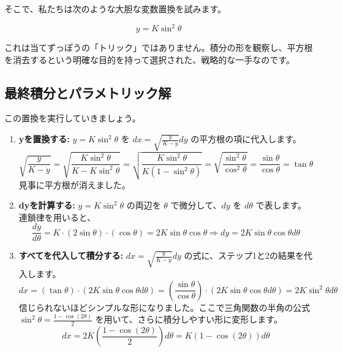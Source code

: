 \documentclass[12pt,a4paper]{ltjsarticle}
\begin{document}
そこで、私たちは次のような大胆な変数置換を試みます。

\begin{equation}
y = K\sin^2\theta
\end{equation}

これは当てずっぽうの「トリック」ではありません。積分の形を観察し、平方根を消去するという明確な目的を持って選択された、戦略的な一手なのです。

\subsection{最終積分とパラメトリック解}

この置換を実行していきましょう。

\begin{enumerate}
\item \textbf{yを置換する:} $y = K \sin^2\theta$ を $dx = \sqrt{\frac{y}{K-y}} dy$ の平方根の項に代入します。
\begin{equation}
\sqrt{\frac{y}{K-y}} = \sqrt{\frac{K \sin^2\theta}{K - K \sin^2\theta}} = \sqrt{\frac{K \sin^2\theta}{K(1 - \sin^2\theta)}} = \sqrt{\frac{\sin^2\theta}{\cos^2\theta}} = \frac{\sin\theta}{\cos\theta} = \tan\theta
\end{equation}
見事に平方根が消えました。

\item \textbf{dyを計算する:} $y = K \sin^2\theta$ の両辺を $\theta$ で微分して、$dy$ を $d\theta$ で表します。連鎖律を用いると、
\begin{equation}
\frac{dy}{d\theta} = K \cdot (2 \sin\theta) \cdot (\cos\theta) = 2K \sin\theta \cos\theta \Rightarrow dy = 2K \sin\theta \cos\theta d\theta
\end{equation}

\item \textbf{すべてを代入して積分する:} $dx = \sqrt{\frac{y}{K-y}} dy$ の式に、ステップ1と2の結果を代入します。
\begin{equation}
dx = (\tan\theta) \cdot (2K \sin\theta \cos\theta d\theta) = \left(\frac{\sin\theta}{\cos\theta}\right) \cdot (2K \sin\theta \cos\theta d\theta) = 2K \sin^2\theta d\theta
\end{equation}
信じられないほどシンプルな形になりました。ここで三角関数の半角の公式 $\sin^2\theta = \frac{1 - \cos(2\theta)}{2}$ を用いて、さらに積分しやすい形に変形します。
\begin{equation}
dx = 2K\left(\frac{1 - \cos(2\theta)}{2}\right)d\theta = K(1 - \cos(2\theta))d\theta
\end{equation}


\end{enumerate}
\end{document}
